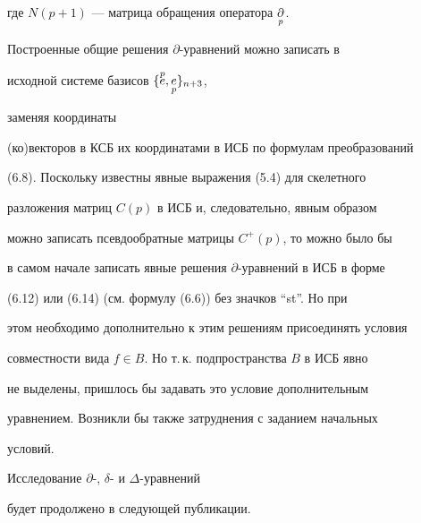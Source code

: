 где $N(p+1)$ --- матрица обращения оператора $\underset{p}{\partial}{}$. 


 


Построенные общие решения $\partial$-уравнений можно записать в 


исходной системе базисов $\{\overset{p}{e}{},\underset{p}{e}{}\}_{n+3}$, 


заменяя координаты 


(ко)векторов в КСБ их координатами в ИСБ по формулам преобразований 


(6.8). Поскольку известны явные выражения (5.4) для скелетного 


разложения матриц $C(p)$ в ИСБ и, следовательно, явным образом 


можно записать псевдообратные матрицы $C^+(p)$, то можно было бы 


в самом начале записать явные решения $\partial$-уравнений в ИСБ в форме 


(6.12) или (6.14) (см. формулу (6.6)) без значков ``st''. Но при 


этом необходимо дополнительно к этим решениям присоединять условия 


совместности вида $f\in B$. Но т.\,к. подпространства $B$ в ИСБ явно 


не выделены, пришлось бы задавать это условие дополнительным 


уравнением. Возникли бы также затруднения с заданием начальных 


условий. 


 


Исследование $\partial$-, $\delta$- и $\Delta$-уравнений 


будет продолжено в следующей публикации. 


 


